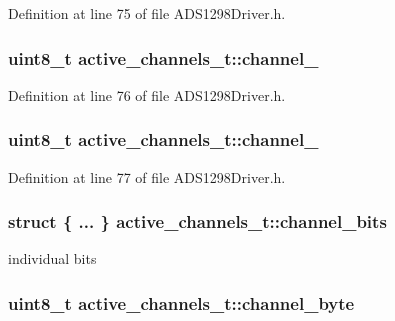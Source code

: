 \-Definition at line 75 of file \-A\-D\-S1298\-Driver.\-h.

\hypertarget{structactive__channels__t_a2bc29deaea047a36824f03159e3d0158}{
\subsubsection[{channel\-\_\-7}]{\setlength{\rightskip}{0pt plus 5cm}uint8\-\_\-t {\bf active\-\_\-channels\-\_\-t\-::channel\-\_}}}\label{structactive__channels__t_a2bc29deaea047a36824f03159e3d0158}


\-Definition at line 76 of file \-A\-D\-S1298\-Driver.\-h.

\hypertarget{structactive__channels__t_ab91881cb0fd2ec1f8fd59e30e8fc279b}{
\subsubsection[{channel\-\_\-8}]{\setlength{\rightskip}{0pt plus 5cm}uint8\-\_\-t {\bf active\-\_\-channels\-\_\-t\-::channel\-\_}}}\label{structactive__channels__t_ab91881cb0fd2ec1f8fd59e30e8fc279b}


\-Definition at line 77 of file \-A\-D\-S1298\-Driver.\-h.

\hypertarget{structactive__channels__t_a7856ced3f539238aa3a3287a775690b4}{
\subsubsection[{channel\-\_\-bits}]{\setlength{\rightskip}{0pt plus 5cm}struct \{ ... \}   {\bf active\-\_\-channels\-\_\-t\-::channel\-\_\-bits}}}\label{structactive__channels__t_a7856ced3f539238aa3a3287a775690b4}


individual bits 

\hypertarget{structactive__channels__t_a68c8307495350c21226b0a541c219486}{
\subsubsection[{channel\-\_\-byte}]{\setlength{\rightskip}{0pt plus 5cm}uint8\-\_\-t {\bf active\-\_\-channels\-\_\-t\-::channel\-\_\-byte}}}\label{structactive__channels__t_a68c8307495350c21226b0a541c219486}


